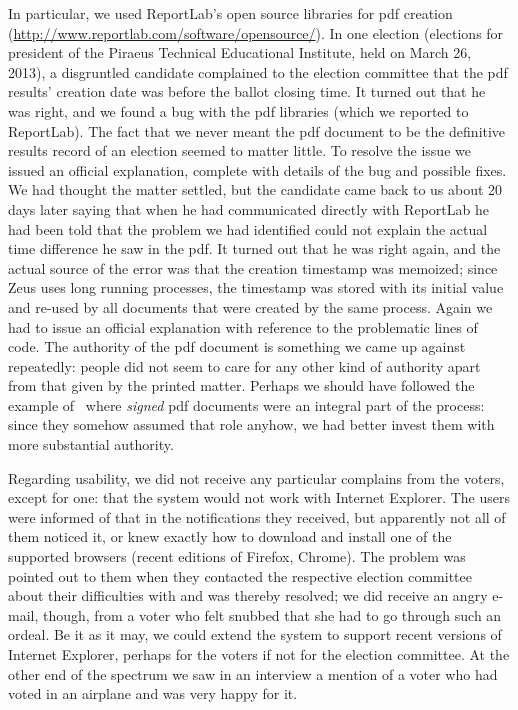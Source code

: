 \documentclass[jets]{usenixjournal}
\begin{document}
In particular, we used ReportLab's open source libraries for {\sc pdf}
creation (\url{http://www.reportlab.com/software/opensource/}). In one
election (elections for president of the Piraeus Technical Educational
Institute, held on March 26, 2013), a disgruntled candidate complained
to the election committee that the {\sc pdf} results' creation date
was before the ballot closing time. It turned out that he was right,
and we found a bug with the {\sc pdf} libraries (which we reported to
ReportLab). The fact that we never meant the {\sc pdf} document to be
the definitive results record of an election seemed to matter little.
To resolve the issue we issued an official explanation, complete with
details of the bug and possible fixes. We had thought the matter
settled, but the candidate came back to us about 20 days later saying
that when he had communicated directly with ReportLab he had been told
that the problem we had identified could not explain the actual time
difference he saw in the {\sc pdf}. It turned out that he was right
again, and the actual source of the error was that the creation
timestamp was memoized; since Zeus uses long running processes, the
timestamp was stored with its initial value and re-used by all
documents that were created by the same process. Again we had to issue
an official explanation with reference to the problematic lines of
code. The authority of the {\sc pdf} document is something we came up
against repeatedly: people did not seem to care for any other kind of
authority apart from that given by the printed matter. Perhaps we
should have followed the example of~\cite{adida:2009} where
\emph{signed} {\sc pdf} documents were an integral part of the
process: since they somehow assumed that role anyhow, we had better
invest them with more substantial authority.

Regarding usability, we did not receive any particular complains from
the voters, except for one: that the system would not work with
Internet Explorer. The users were informed of that in the
notifications they received, but apparently not all of them noticed
it, or knew exactly how to download and install one of the supported
browsers (recent editions of Firefox, Chrome). The problem was pointed
out to them when they contacted the respective election committee
about their difficulties with and was thereby resolved; we did receive
an angry e-mail, though, from a voter who felt snubbed that she had to
go through such an ordeal. Be it as it may, we could extend the system
to support recent versions of Internet Explorer, perhaps for the voters
if not for the election committee. At the other end of the spectrum we
saw in an interview a mention of a voter who had voted in an airplane
and was very happy for it.
\end{document}
